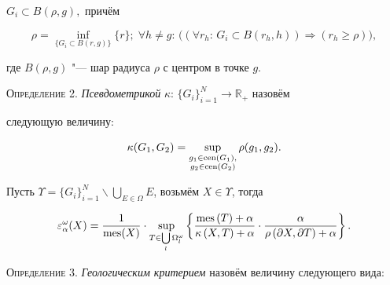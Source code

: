 $G_i \subset B(\rho, g),$ причём

$$

\rho =\inf \limits_{\{ G_i \subset B(r, g) \}} \{ r\};\;

\forall h\ne g{:}\, \bigl(  ( \forall r_h {:}\, G_i \subset B(r_h, h) )\Rightarrow ( r_h \geqslant \rho )\bigr),

$$

где $B(\rho, g)$ "--- шар радиуса $\rho $ с центром в точке $g.$





\textsc{\small Определение 2.} {\it Псевдометрикой} $\kappa {:}\, \bigl\{ G_i  \bigr\}_{i=1}^N \to \mathbb R_+ $ назовём

следующую величину:

\[

\kappa (G_1, G_2 )=\sup \limits_{

\begin{subarray}{c}

 g_1 \in {\rm cen}(G_1 ), \\

 g_2 \in {\rm cen}(G_2)  \end{subarray} } \rho (g_1, g_2 ).

\]



Пусть $\Upsilon =\bigl\{ G_i  \bigr\}_{i=1}^N \backslash

\bigcup\limits_{E\in \Omega } E $, возьмём $X\in \Upsilon $, тогда

$$

\varepsilon _\alpha ^\omega (X)=\frac1{{\rm mes}(X)}

\cdot \sup \limits_{T\in \bigcup\limits_l {\Omega

_l^\omega } } \left\{ {\frac{{\rm mes}\left( T \right)+\alpha }{\kappa \left(

{X,T} \right)+\alpha }\cdot \frac{\alpha }{\rho \left( {\partial X,\partial

T} \right)+\alpha }} \right\}.

$$



\textsc{\small Определение 3.} {\it Геологическим критерием} назовём величину следующего вида:



